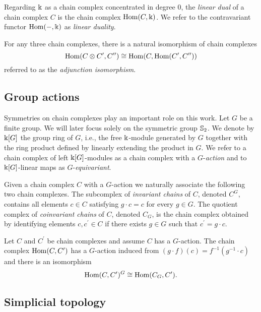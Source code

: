 Regarding $\k$ as a chain complex concentrated in degree $0$, the \textit{linear dual} of a chain complex $C$ is the chain complex $\Hom(C, \k)$.
We refer to the contravariant functor $\Hom(-, \k)$ as \textit{linear duality}.

For any three chain complexes, there is a natural isomorphism of chain complexes
\begin{equation} \label{e:adjunction isomorphism}
\Hom(C \otimes C^\prime, C^{\prime\prime}) \cong
\Hom(C, \Hom(C^\prime, C^{\prime\prime}))
\end{equation}
referred to as the \textit{adjunction isomorphism}.

\subsection{Group actions}

Symmetries on chain complexes play an important role on this work.
Let $G$ be a finite group.
We will later focus solely on the symmetric group $\S_2$.
We denote by $\k[G]$ the group ring of $G$, i.e., the free $\k$-module generated by $G$ together with the ring product defined by linearly extending the product in $G$.
We refer to a chain complex of left $\k[G]$-modules as a chain complex with a $G$-\textit{action} and to $\k[G]$-linear maps as $G$-\textit{equivariant}.

Given a chain complex $C$ with a $G$-action we naturally associate the following two chain complexes.
The subcomplex of \textit{invariant chains} of $C$, denoted $C^G$, contains all elements $c \in C$ satisfying $g \cdot c = c$ for every $g \in G$.
The quotient complex of \textit{coinvariant chains} of $C$, denoted $C_G$, is the chain complex obtained by identifying elements $c, c^\prime \in C$ if there exists $g \in G$ such that $c^\prime = g \cdot c$.

Let $C$ and $C^\prime$ be chain complexes and assume $C$ has a $G$-action.
The chain complex $\Hom(C, C^\prime)$ has a $G$-action induced from $(g \cdot f)(c) = f^{-1}(g^{-1} \cdot c)$ and there is an isomorphism
\begin{equation} \label{e:invariant hom iso hom coinvariants}
\Hom(C, C^\prime)^G \cong \Hom(C_G, C^\prime).
\end{equation}

\subsection{Simplicial topology}

